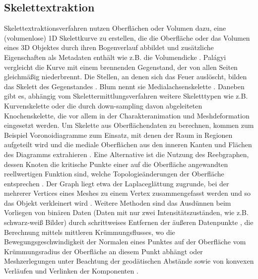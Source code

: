 \subsection{Skelettextraktion}
Skelettextraktionsverfahren nutzen Oberflächen oder Volumen dazu, eine (volumenlose) 1D Skelettkurve zu erstellen, die die Oberfläche oder das Volumen eines 3D Objektes durch ihren Bogenverlauf abbildet und zusätzliche Eigenschaften als Metadaten enthält wie z.B. die Volumendicke \cite{au2008skeletonExtractionbyMeshContraction}. Palágyi vergleicht die Kurve mit einem brennenden Gegenstand, der von allen Seiten gleichmäßig niederbrennt. Die Stellen, an denen sich das Feuer auslöscht, bilden das Skelett des Gegenstandes \cite{palagyi2008parallelSurfaceThinning}. Blum nennt sie Medialachsenskelette \cite{blum1967descriptorsOfShape}. Daneben gibt es, abhängig vom Skelettermittlungsverfahren weitere Skeletttypen wie z.B. Kurvenskelette \cite{dey2006CurveSkeletonsMedialGeodesicFunction} \cite{cornea2007curveSkeletonProperties} oder die durch down-sampling davon abgeleiteten Knochenskelette, die vor allem in der Charakteranimation \cite{wang2007envelopingRotiationalRegression} und Meshdeformation \cite{weber2007contextAwareSkeletalShapeDeformation} eingesetzt werden.
Um Skelette aus Oberflächendaten zu berechnen, kommen zum Beispiel Voronoidiagramme zum Einsatz, mit denen der Raum in Regionen aufgeteilt wird und die mediale Oberflächen aus den inneren Kanten und Flächen des Diagramms extrahieren \cite{dey2006CurveSkeletonsMedialGeodesicFunction}. Eine Alternative ist die Nutzung des Reebgraphen, dessen Knoten die kritische Punkte einer auf die Oberfläche angewandten reellwertigen Funktion sind, welche Topologieänderungen der Oberfläche entsprechen \cite{pascucci2007computationReebGraph}. Der Graph liegt etwa der Laplaceglättung zugrunde, bei der mehrerer Vertices eines Meshes zu einem Vertex zusammengefasst werden und so das Objekt verkleinert wird \cite{au2008skeletonExtractionbyMeshContraction}. Weitere Methoden sind das Ausdünnen beim Vorliegen von binären Daten (Daten mit nur zwei Intensitätszuständen, wie z.B. schwarz-weiß Bilder) durch schrittweises Entfernen der äußeren Datenpunkte \cite{palagyi2008parallelSurfaceThinning}, die Berechnung mittels mittleren Krümmungsflusses, wo die Bewegungsgeschwindigkeit der Normalen eines Punktes auf der Oberfläche vom Krümmungsradius der Oberfläche an diesem Punkt abhängt \cite{tagliasacchi2012meanCurvatureSkeletons} oder Meshzerlegungen unter Beachtung der geodätischen Abstände sowie von konvexen Verläufen und Verlinken der Komponenten \cite{katz2003meshDecomposition}.
